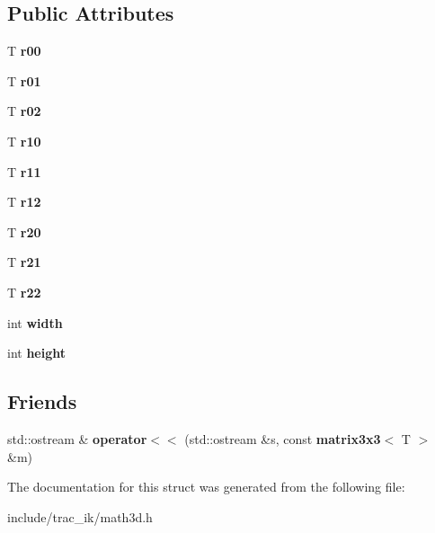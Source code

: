 \subsection*{Public Attributes}
\begin{DoxyCompactItemize}
\item 
T {\bfseries r00}\label{structmath3d_1_1matrix3x3_a7f280d0c2ad39574fd6dd13506461d66}

\item 
T {\bfseries r01}\label{structmath3d_1_1matrix3x3_a7be507c7a931c050ae2164d591521300}

\item 
T {\bfseries r02}\label{structmath3d_1_1matrix3x3_a95e154a7d96cf9629678a451d82ed6d4}

\item 
T {\bfseries r10}\label{structmath3d_1_1matrix3x3_a7ba15351bd82371afeb04c1d8e34754d}

\item 
T {\bfseries r11}\label{structmath3d_1_1matrix3x3_ad4d1aa86fc2ffe9fd4eb59b77d1ecb68}

\item 
T {\bfseries r12}\label{structmath3d_1_1matrix3x3_ae4cba9e2e7b6767249dd72d15f417ab6}

\item 
T {\bfseries r20}\label{structmath3d_1_1matrix3x3_ad553441f0ae9a30d0adf759b9520adad}

\item 
T {\bfseries r21}\label{structmath3d_1_1matrix3x3_afb756a89e378ea25cbd7d7fabac97c70}

\item 
T {\bfseries r22}\label{structmath3d_1_1matrix3x3_ab91dd1376465a017aa7d650bacac6c02}

\item 
int {\bfseries width}\label{structmath3d_1_1matrix3x3_a6bd4dab33ee0c9a3522ba8e0c335ef73}

\item 
int {\bfseries height}\label{structmath3d_1_1matrix3x3_a061b6cd8e64cdfbe2da53109c5a2228d}

\end{DoxyCompactItemize}
\subsection*{Friends}
\begin{DoxyCompactItemize}
\item 
std\-::ostream \& {\bfseries operator$<$$<$} (std\-::ostream \&s, const {\bf matrix3x3}$<$ T $>$ \&m)\label{structmath3d_1_1matrix3x3_a89cd5fbbe4fceb5214e79228bcd864f9}

\end{DoxyCompactItemize}


The documentation for this struct was generated from the following file\-:\begin{DoxyCompactItemize}
\item 
include/trac\-\_\-ik/math3d.\-h\end{DoxyCompactItemize}
